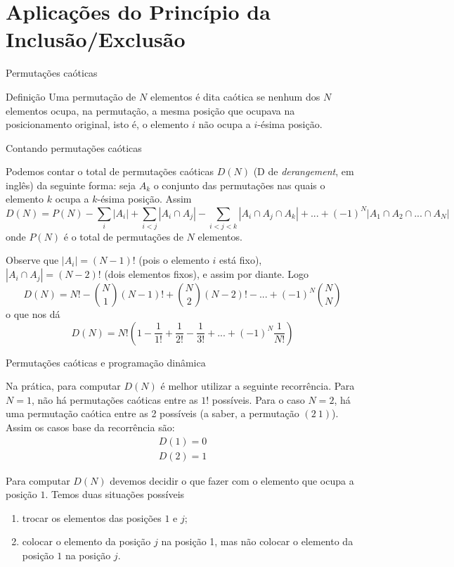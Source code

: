 \section*{Aplicações do Princípio da Inclusão/Exclusão}

\begin{frame}[fragile]{Permutações caóticas}

    \begin{block}{Definição}
        Uma permutação de $N$ elementos é dita caótica se nenhum dos $N$ elementos ocupa, na 
        permutação, a mesma posição que ocupava na posicionamento original, isto é, o elemento $i$ não
        ocupa a $i$-ésima posição.
    \end{block}

\end{frame}

\begin{frame}[fragile]{Contando permutações caóticas}

    Podemos contar o total de permutações caóticas $D(N)$ (D de \textit{derangement}, em inglês) da
seguinte forma: seja $A_k$ o conjunto das permutações nas quais o elemento $k$ ocupa a $k$-ésima
posição. Assim
\[
        D(N) = P(N) - \sum_{i} | A_i | + \sum_{i<j}| A_i \cap  A_j | - \sum_{i<j<k}| A_i \cap  A_j \cap  A_k | 
             + ... + (-1)^N | A_1 \cap  A_2 \cap  ... \cap  A_N |
\]
onde $P(N)$ é o total de permutações de $N$ elementos. 

Observe que $|A_i| = (N - 1)!$ (pois o elemento $i$ está fixo), $|A_i \cap A_j| = (N - 2)!$ (dois elementos fixos), e assim por diante.
Logo
\[
        D(N) = N! - \binom{N}{1}(N - 1)! + \binom{N}{2}(N - 2)! - ... + (-1)^N \binom{N}{N}
\]
o que nos dá
\[
        D(N) = N!\left(1 - \frac{1}{1!} + \frac{1}{2!} - \frac{1}{3!} + ... + (-1)^N\frac{1}{N!}\right)
\]

\end{frame}

\begin{frame}[fragile]{Permutações caóticas e programação dinâmica}

Na prática, para computar $D(N)$ é melhor utilizar a seguinte recorrência. Para $N = 1$, não 
há permutações caóticas entre as $1!$ possíveis. Para o caso $N = 2$, há uma permutação caótica
entre as 2 possíveis (a saber, a permutação $(2\ 1)$). Assim os casos base da recorrência são:
\[
\begin{array}{l}
        D(1) = 0 \\
        D(2) = 1
\end{array}
\]

Para computar $D(N)$ devemos decidir o que fazer com o elemento que ocupa a posição $1$. Temos duas situações
possíveis
\begin{enumerate}
    \item trocar os elementos das posições $1$ e $j$;
    \item colocar o elemento da posição $j$ na posição 1, mas não colocar o elemento da posição $1$ na posição $j$.
\end{enumerate}

\end{frame}


